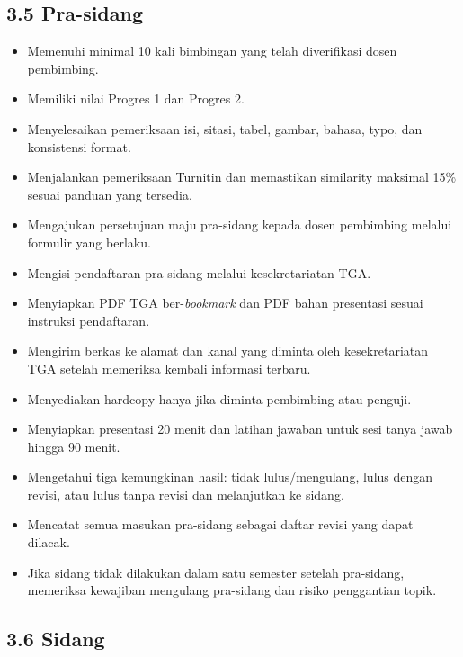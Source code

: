 \documentclass[
  indonesian,
  11pt,
]{article}
\providecommand{\tightlist}{%
  \setlength{\itemsep}{0pt}\setlength{\parskip}{0pt}}
\renewcommand{\tightlist}{%
  \setlength{\itemsep}{0.22em}%
  \setlength{\parskip}{0pt}%
}
\begin{document}
\subsection{3.5 Pra-sidang}\label{pra-sidang}

\begin{itemize}
\tightlist
\item[$\square$]
  Memenuhi minimal 10 kali bimbingan yang telah diverifikasi dosen
  pembimbing.
\item[$\square$]
  Memiliki nilai Progres 1 dan Progres 2.
\item[$\square$]
  Menyelesaikan pemeriksaan isi, sitasi, tabel, gambar, bahasa, typo,
  dan konsistensi format.
\item[$\square$]
  Menjalankan pemeriksaan Turnitin dan memastikan similarity maksimal
  15\% sesuai panduan yang tersedia.
\item[$\square$]
  Mengajukan persetujuan maju pra-sidang kepada dosen pembimbing melalui
  formulir yang berlaku.
\item[$\square$]
  Mengisi pendaftaran pra-sidang melalui kesekretariatan TGA.
\item[$\square$]
  Menyiapkan PDF TGA ber-\emph{bookmark} dan PDF bahan presentasi sesuai
  instruksi pendaftaran.
\item[$\square$]
  Mengirim berkas ke alamat dan kanal yang diminta oleh kesekretariatan
  TGA setelah memeriksa kembali informasi terbaru.
\item[$\square$]
  Menyediakan hardcopy hanya jika diminta pembimbing atau penguji.
\item[$\square$]
  Menyiapkan presentasi 20 menit dan latihan jawaban untuk sesi tanya
  jawab hingga 90 menit.
\item[$\square$]
  Mengetahui tiga kemungkinan hasil: tidak lulus/mengulang, lulus dengan
  revisi, atau lulus tanpa revisi dan melanjutkan ke sidang.
\item[$\square$]
  Mencatat semua masukan pra-sidang sebagai daftar revisi yang dapat
  dilacak.
\item[$\square$]
  Jika sidang tidak dilakukan dalam satu semester setelah pra-sidang,
  memeriksa kewajiban mengulang pra-sidang dan risiko penggantian topik.
\end{itemize}

\subsection{3.6 Sidang}\label{sidang}
\end{document}
